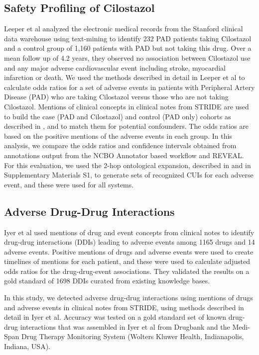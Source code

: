 \subsection{Safety Profiling of Cilostazol}
Leeper et al \cite{Leeper2013} analyzed the electronic medical records
from the Stanford clinical data warehouse using text-mining to
identify 232 PAD patients taking Cilostazol and a control group of
1,160 patients with PAD but not taking this drug. Over a mean follow
up of 4.2 years, they observed no association between Cilostazol use
and any major adverse cardiovascular event including stroke,
myocardial infarction or death. We used the methods described in
detail in Leeper et al to calculate odds ratios for a set of adverse
events in patients with Peripheral Artery Disease (PAD) who are taking
Cilostazol versus those who are not taking Cilostazol.  Mentions of
clinical concepts in clinical notes from STRIDE are used to build the
case (PAD and Cilostazol) and control (PAD only) cohorts as described
in \cite{Patrick2010}, and to match them for potential confounders.
The odds ratios are based on the positive mentions of the adverse
events in each group.  In this analysis, we compare the odds ratios
and confidence intervals obtained from annotations output from the
NCBO Annotator based workflow and REVEAL.  For this evaluation, we
used the 2-hop ontological expansion, described in \cite{Lependu2013}
and in Supplementary Materials S1, to generate sets of recognized CUIs
for each adverse event, and these were used for all systems.

\subsection{Adverse Drug-Drug Interactions}
Iyer et al \cite{Iyer2014} used mentions of drug and event concepts
from clinical notes to identify drug-drug interactions (DDIs) leading
to adverse events among 1165 drugs and 14 adverse events.  Positive
mentions of drugs and adverse events were used to create timelines of
mentions for each patient, and these were used to calculate adjusted
odds ratios for the drug-drug-event associations.  They validated the
results on a gold standard of 1698 DDIs curated from existing
knowledge bases.

In this study, we detected adverse drug-drug interactions using
mentions of drugs and adverse events in clinical notes from STRIDE,
using methods described in detail in Iyer et al.  Accuracy was tested
on a gold standard set of known drug-drug interactions that was
assembled in Iyer et al from Drugbank \cite{Knox2011} and the
Medi-Span Drug Therapy Monitoring System (Wolters Kluwer Health,
Indianapolis, Indiana, USA).

